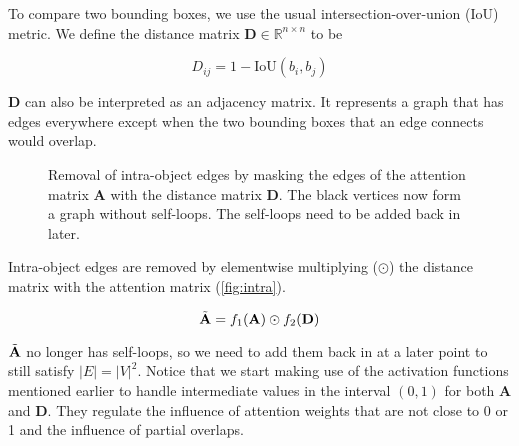 \documentclass[letterpaper]{article}
\newcommand{\m}[1]{\mathbf{#1}}
\begin{document}
To compare two bounding boxes, we use the usual intersection-over-union (IoU) metric.
We define the distance matrix $\m D \in \mathbb{R}^{n \times n}$ to be

\begin{equation}
    D_{ij} = 1 - \text{IoU}(b_i, b_j)
\end{equation}

$\m D$ can also be interpreted as an adjacency matrix.
It represents a graph that has edges everywhere except when the two bounding boxes that an edge connects would overlap.

\begin{figure}
    \centering
    \caption{
        Removal of intra-object edges by masking the edges of the attention matrix $\m A$ with the distance matrix $\m D$.
        The black vertices now form a graph without self-loops.
        The self-loops need to be added back in later.
    }
    \label{fig:intra}
\end{figure}

Intra-object edges are removed by elementwise multiplying ($\odot$) the distance matrix with the attention matrix (\autoref{fig:intra}).

\begin{equation}
    \AO = f_1 (\m A) \odot f_2 (\m D)
\end{equation}

$\AO$ no longer has self-loops, so we need to add them back in at a later point to still satisfy $|E| = |V|^2$.
Notice that we start making use of the activation functions mentioned earlier to handle intermediate values in the interval $(0, 1)$ for both $\m A$ and $\m D$.
They regulate the influence of attention weights that are not close to 0 or 1 and the influence of partial overlaps.
\end{document}
